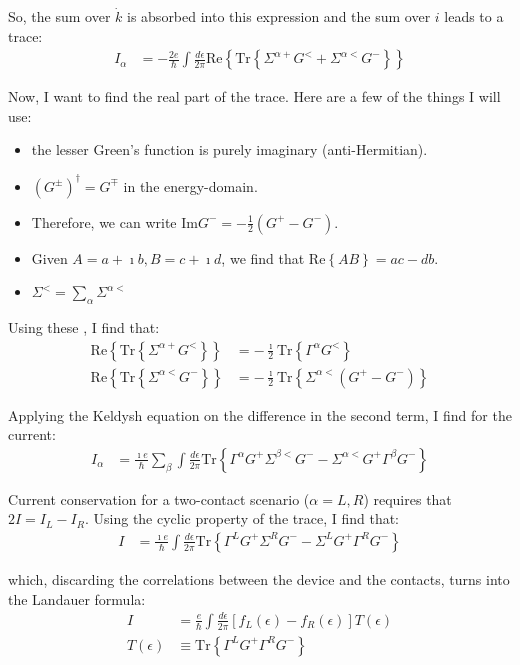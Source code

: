 So, the sum over $\dot{k}$ is absorbed into this expression and the sum over $i$ leads to a trace:
\begin{align*}
I_\alpha &= -\frac{2e}{\hbar} \int \frac{d\epsilon}{2\pi} \text{Re} \left\{ \text{Tr} \left \{ \Sigma^{\alpha+} G^< + \Sigma^{\alpha <} G^-\right\}\right\}
\end{align*}

Now, I want to find the real part of the trace. Here are a few of the things I will use:
\begin{itemize}
\item the lesser Green's function is purely imaginary (anti-Hermitian). 
\item $(G^\pm)^\dagger = G^\mp$ in the energy-domain.
\item Therefore, we can write $\text{Im} G^- = - \frac{1}{2} \left( G^+ - G^- \right)$.
\item Given $A=a+\imath b, B = c + \imath d$, we find that $\text{Re}\left\{ AB \right\} = ac - db$.
\item $\Sigma^< = \sum_\alpha \Sigma^{\alpha<}$
\end{itemize}

Using these , I find that:
\begin{align*}
\text{Re}\left\{\text{Tr}\left\{ \Sigma^{\alpha+} G^<\right\}\right\} &= - \frac{\imath}{2} \text{Tr}\left\{ \Gamma^\alpha G^< \right\} \\
\text{Re}\left\{\text{Tr}\left\{ \Sigma^{\alpha<} G^-\right\}\right\} &= - \frac{\imath}{2} \text{Tr}\left\{\Sigma^{\alpha<} \left(G^+ - G^-\right)\right\}
\end{align*}

Applying the Keldysh equation on the difference in the second term, I find for the current:
\begin{align*}
I_\alpha &= \frac{\imath e}{\hbar} \sum_\beta \int \frac{d\epsilon}{2\pi} \text{Tr}\left\{ \Gamma^\alpha G^+ \Sigma^{\beta <}G^- - \Sigma^{\alpha<}G^+\Gamma^\beta G^- \right\}
\end{align*}

Current conservation for a two-contact scenario ($\alpha=L,R$) requires that $2 I = I_L - I_R$. Using the cyclic property of the trace, I find that:
\begin{align*}
I &= \frac{\imath e}{\hbar} \int \frac{d\epsilon}{2\pi} \text{Tr}\left\{ \Gamma^L G^+ \Sigma^R G^- - \Sigma^L G^+ \Gamma^R G^-\right\}
\end{align*}

which, discarding the correlations between the device and the contacts, turns into the Landauer formula:
\begin{align}
I &= \frac{e}{\hbar} \int \frac{d\epsilon}{2\pi} \left[ f_L(\epsilon) - f_R(\epsilon)\right] T(\epsilon) \label{eq:landauer}\\
T(\epsilon)&\equiv \text{Tr}\left\{ \Gamma^L G^+ \Gamma^R G^-\right\}\nonumber
\end{align}

